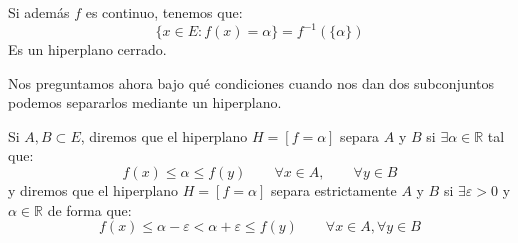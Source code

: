 \begin{observacion}
    Si además $f$ es continuo, tenemos que:
    \begin{equation*}
        \{x\in E : f(x) = \alpha\} = f^{-1}(\{\alpha\})
    \end{equation*}
    Es un hiperplano cerrado.
\end{observacion}

Nos preguntamos ahora bajo qué condiciones cuando nos dan dos subconjuntos podemos separarlos mediante un hiperplano.

\begin{definicion}
    Si $A,B\subset E$, diremos que el hiperplano $H=[f=\alpha]$ separa $A$ y $B$ si $\exists \alpha\in \mathbb{R}$ tal que: 
    \begin{equation*}
        f(x) \leq \alpha \leq f(y) \qquad \forall x\in A,\qquad  \forall y\in B
    \end{equation*}
    y diremos que el hiperplano $H=[f=\alpha]$ separa estrictamente $A$ y $B$ si $\exists \varepsilon>0$ y $\alpha \in \mathbb{R}$ de forma que:
    \begin{equation*}
        f(x) \leq \alpha - \varepsilon < \alpha+\varepsilon \leq f(y) \qquad \forall x\in A, \forall y\in B
    \end{equation*}
\end{definicion}


